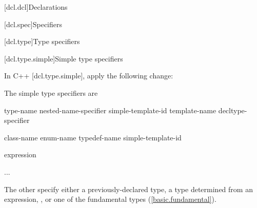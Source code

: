 
[dcl.dcl]{Declarations}

[dcl.spec]{Specifiers}

\setcounter{subsection}{6}
[dcl.type]{Type specifiers}

\setcounter{subsubsection}{1}
[dcl.type.simple]{Simple type specifiers}

\pnum
In C++ [dcl.type.simple], apply the following change:

\begin{std.txt}
The simple type specifiers are

\begin{bnf}
\br
     type-name\br
    nested-name-specifier  simple-template-id\br
     template-name\br
    \br
    \br
    \br
    \br
    \br
    \br
    \br
    \br
    \br
    \br
    \br
    \br
    \br
    \br
    decltype-specifier\br
\end{bnf}

\begin{bnf}
\br
    class-name\br
    enum-name\br
    typedef-name\br
    simple-template-id
\end{bnf}

\begin{bnf}
\br
   \terminal{(} expression \terminal{)}\br
   \terminal{(}  \terminal{)}
\end{bnf}

\begin{bnf}
\br
\end{bnf}

\begin{bnf}
\br
  \added{\terminal{::}}\br
  \br
  \br
  \br
  \br
  \br
  \br
\end{bnf}

...

The other  specify either a
previously-declared type, a type determined from an expression, , or one of the
fundamental types (\ref{basic.fundamental}).
\end{std.txt}

